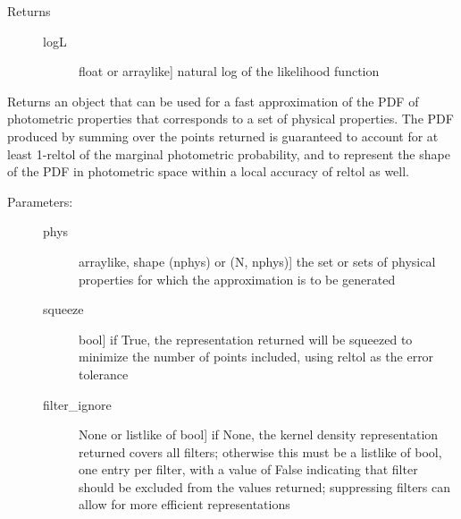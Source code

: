\documentclass[letterpaper,10pt,english]{sphinxmanual}
\begin{document}
\begin{fulllineitems}
\begin{fulllineitems}
\begin{description}
\begin{description}
\end{description}

\item[{Returns}] \leavevmode\begin{description}
\item[{logL}] \leavevmode{[}float or arraylike{]}
natural log of the likelihood function

\end{description}

\end{description}

\end{fulllineitems}


\begin{fulllineitems}
\label{bayesphot:slugpy.bayesphot.bp.bp.make_approx_phot}
Returns an object that can be used for a fast approximation of
the PDF of photometric properties that corresponds to a set of
physical properties. The PDF produced by summing over the
points returned is guaranteed to account for at least 1-reltol
of the marginal photometric probability, and to represent the
shape of the PDF in photometric space within a local accuracy
of reltol as well.
\begin{description}
\item[{Parameters:}] \leavevmode\begin{description}
\item[{phys}] \leavevmode{[}arraylike, shape (nphys) or (N, nphys){]}
the set or sets of physical properties for which the
approximation is to be generated

\item[{squeeze}] \leavevmode{[}bool{]}
if True, the representation returned will be squeezed to
minimize the number of points included, using reltol as
the error tolerance

\item[{filter\_ignore}] \leavevmode{[}None or listlike of bool{]}
if None, the kernel density representation returned
covers all filters; otherwise this must be a listlike of
bool, one entry per filter, with a value of False
indicating that filter should be excluded from the
values returned; suppressing filters can allow for more
efficient representations

\end{description}


\end{description}
\end{fulllineitems}
\end{fulllineitems}
\end{document}
